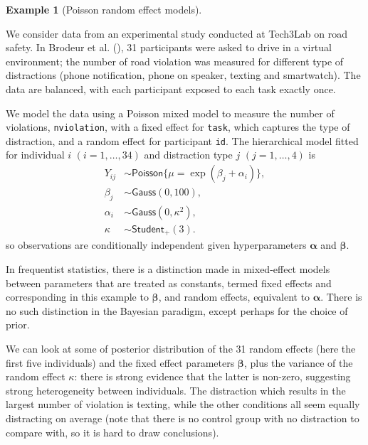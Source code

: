 \documentclass[
  11pt,
  letterpaper,
]{scrbook}
\theoremstyle{definition}
\theoremstyle{plain}
\theoremstyle{plain}
\theoremstyle{definition}
\newtheorem{example}{Example}[chapter]
\theoremstyle{definition}
\theoremstyle{remark}
\begin{document}
\begin{example}[Poisson random effect
models]\protect\hypertarget{exm-randomeffects}{}\label{exm-randomeffects}

We consider data from an experimental study conducted at Tech3Lab on
road safety. In Brodeur et al. (), 31
participants were asked to drive in a virtual environment; the number of
road violation was measured for different type of distractions (phone
notification, phone on speaker, texting and smartwatch). The data are
balanced, with each participant exposed to each task exactly once.

We model the data using a Poisson mixed model to measure the number of
violations, \texttt{nviolation}, with a fixed effect for \texttt{task},
which captures the type of distraction, and a random effect for
participant \texttt{id}. The hierarchical model fitted for individual
\(i\) \((i=1, \ldots, 34)\) and distraction type \(j\)
\((j=1, \ldots, 4)\) is \begin{align*}
Y_{ij} &\sim \mathsf{Poisson}\{\mu = \exp(\beta_{j} + \alpha_i)\},\\
\beta_j &\sim \mathsf{Gauss}(0, 100), \\
\alpha_i &\sim \mathsf{Gauss}(0, \kappa^2), \\
\kappa &\sim \mathsf{Student}_{+}(3).
\end{align*} so observations are conditionally independent given
hyperparameters \(\boldsymbol{\alpha}\) and \(\boldsymbol{\beta}\).

In frequentist statistics, there is a distinction made in mixed-effect
models between parameters that are treated as constants, termed fixed
effects and corresponding in this example to \(\boldsymbol{\beta}\), and
random effects, equivalent to \(\boldsymbol{\alpha}\). There is no such
distinction in the Bayesian paradigm, except perhaps for the choice of
prior.

We can look at some of posterior distribution of the 31 random effects
(here the first five individuals) and the fixed effect parameters
\(\boldsymbol{\beta}\), plus the variance of the random effect
\(\kappa\): there is strong evidence that the latter is non-zero,
suggesting strong heterogeneity between individuals. The distraction
which results in the largest number of violation is texting, while the
other conditions all seem equally distracting on average (note that
there is no control group with no distraction to compare with, so it is
hard to draw conclusions).


\end{example}
\end{document}
